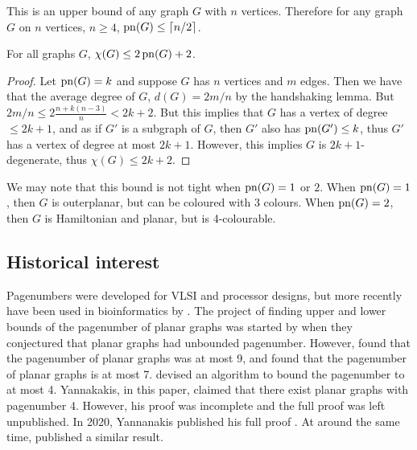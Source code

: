 This is an upper bound of any graph \(G\) with \(n\) vertices.
Therefore for any graph \(G\) on \(n\) vertices, \(n \geq 4\), \(\operatorname{pn}(G) \leq \lceil n/2 \rceil\).
\begin{theorem}\label{thm:Colouring_Bound}
	For all graphs \(G\), \(\chi(G) \leq 2 \operatorname{pn}(G) + 2\).
\end{theorem}
\begin{proof}
	Let \(\operatorname{pn}(G) = k\) and suppose \(G\) has \(n\) vertices and \(m\) edges. Then we have that the average degree of \(G\), \(d(G) = 2m/n\) by the handshaking lemma. But \(2m/n \leq 2 \frac{n + k(n-3)}{n} < 2k + 2\). But this implies that \(G\) has a vertex of degree \(\leq 2k + 1\), and as if \(G'\) is a subgraph of \(G\), then \(G'\) also has \(\operatorname{pn}(G') \leq k\), thus \(G'\) has a vertex of degree at most \(2k + 1\). However, this implies \(G\) is \(2k + 1\)-degenerate, thus \(\chi(G) \leq 2k + 2\).
\end{proof}
We may note that this bound is not tight when \(\operatorname{pn}(G) = 1\) or \(2\). When \(\operatorname{pn}(G) = 1\), then \(G\) is outerplanar, but can be coloured with 3 colours. When \(\operatorname{pn}(G) = 2\), then \(G\) is Hamiltonian and planar, but is 4-colourable.

\subsection{Historical interest}\label{ssec:Pagenumber_History}
Pagenumbers were developed for VLSI and processor designs, but more recently have been used in bioinformatics by \textcite{haslingerRNAStructuresPseudoknots1999}.
The project of finding upper and lower bounds of the pagenumber of planar graphs was started by \textcite{bernhartBookThicknessGraph1979} when they conjectured that planar graphs had unbounded pagenumber. However, \textcite{bussPagenumberPlanarGraphs1984} found that the pagenumber of planar graphs was at most 9, and \textcite{heathEmbeddingPlanarGraphs1984} found that the pagenumber of planar graphs is at most 7. \textcite{yannakakisEmbeddingPlanarGraphs1989} devised an algorithm to bound the pagenumber to at most 4. Yannakakis, in this paper, claimed that there exist planar graphs with pagenumber 4. However, his proof was incomplete and the full proof was left unpublished. In 2020, Yannanakis published his full proof \cite{yannakakisPlanarGraphsThat2020}. At around the same time, \textcite{kaufmannFourPagesAre2020} published a similar result.

